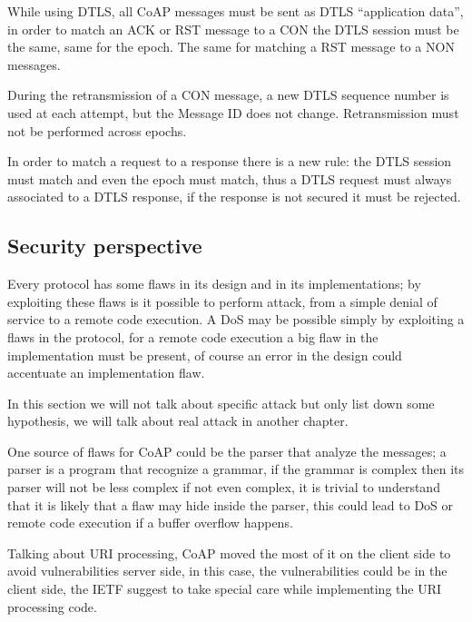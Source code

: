 	While using DTLS, all CoAP messages must be sent as DTLS “application data”, in order to match an ACK or RST message to a CON the DTLS session must be the same, same for the epoch.\newline
	The same for matching a RST message to a NON messages.\newline
	
	During the retransmission of a CON message, a new DTLS sequence number is used at each attempt, but the Message ID does not change.\newline
	Retransmission must not be performed across epochs.\newline
	
	In order to match a request to a response there is a new rule: the DTLS session must match and even the epoch must match, thus a DTLS request must always associated to a DTLS response, if the response is not secured it must be rejected.
	
	\subsection{Security perspective}
	Every protocol has some flaws in its design and in its implementations; by exploiting these flaws is it possible to perform attack, from a simple denial of service to a remote code execution.\newline
	A DoS may be possible simply by exploiting a flaws in the protocol, for a remote code execution a big flaw in the implementation must be present, of course an error in the design could accentuate an implementation flaw.\newline
	
	In this section we will not talk about specific attack but only list down some hypothesis, we will talk about real attack in another chapter.\newline
	
	One source of flaws for CoAP could be the parser that analyze the messages; a parser is a program that recognize a grammar, if the grammar is complex then its parser will not be less complex if not even complex, it is trivial to understand that it is likely that a flaw may hide inside the parser, this could lead to DoS or remote code execution if a buffer overflow happens.\newline
	
	Talking about URI processing, CoAP moved the most of it on the client side to avoid vulnerabilities server side, in this case, the vulnerabilities could be in the client side, the IETF suggest to take special care while implementing the URI processing code.\newline
	
